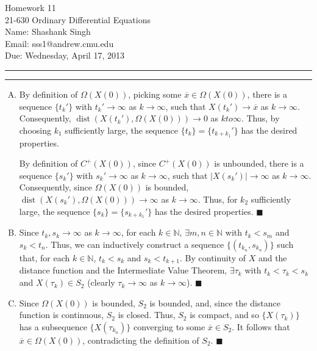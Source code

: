 \documentclass[11pt]{article}
\makeatletter
\newcounter{questionCounter}
\newcounter{partCounter}[questionCounter]
\newenvironment{question}[2][\arabic{questionCounter}]{%
    \setcounter{partCounter}{0}%
    \vspace{.25in} \hrule \vspace{0.5em}%
        \noindent{\bf #2}%
    \vspace{0.8em} \hrule \vspace{.10in}%
    \addtocounter{questionCounter}{1}%
}{}
\newcommand{\myname}{Shashank Singh}
\newcommand{\myandrew}{sss1@andrew.cmu.edu}
\newcommand{\myclass}{21-630 Ordinary Differential Equations}
\newcommand{\myhwnum}{11}
\newcommand{\duedate}{Wednesday, April 17, 2013}
\renewcommand{\qed}{\quad $\blacksquare$}
\newcommand{\dist}{\operatorname{dist}}
\newcommand{\N}{\mathbb{N}} %
\newcommand{\ol}{\overline}
\makeatother
\begin{document}
\thispagestyle{plain}

{\Large Homework \myhwnum} \\
\myclass            \\
Name: \myname       \\
Email: \myandrew    \\
Due: \duedate

\vspace{-0.2in}
\begin{question}{Problem 1}
\vspace{-0.2in}
\begin{enumerate}[A)]
\item By definition of $\Omega(X(0))$, picking some $\ol x \in \Omega(X(0))$,
there is a sequence $\{t_k'\}$ with $t_k' \to \infty$ as
$k \to \infty$, such that $X(t_k') \to \ol x$ as $k \to \infty$. Consequently,
$\dist(X(t_k'),\Omega(X(0))) \to 0$ as $k to \infty$. Thus, by choosing $k_1$
sufficiently large, the sequence $\{t_k\} = \{t_{k + k_1}'\}$ has the desired
properties.

By definition of $C^+(X(0))$, since $C^+(X(0))$ is unbounded, there is a
sequence $\{s_k'\}$ with $s_k' \to \infty$ as $k \to \infty$, such that
$|X(s_k')| \to \infty$ as $k \to \infty$. Consequently, since $\Omega(X(0))$ is
bounded, $\dist(X(s_k'),\Omega(X(0))) \to \infty$ as $k \to \infty$. Thus, for
$k_2$ sufficiently large, the sequence $\{s_k\} = \{s_{k + k_1}'\}$ has the
desired properties. \qed

\item Since $t_k,s_k \to \infty$ as $k \to \infty$, for each $k \in \N$,
$\exists m,n \in \N$ with $t_k < s_m$ and $s_k < t_n$. Thus, we can inductively
construct a sequence $\{(t_{k_n},s_{k_n})\}$ such that, for each $k \in \N$,
$t_k < s_k$ and $s_k < t_{k + 1}$. By continuity of $X$ and the distance
function and the Intermediate Value Theorem, $\exists \tau_k$ with
$t_k < \tau_k < s_k$ and $X(\tau_k) \in S_2$ (clearly $\tau_k \to \infty$ as
$k \to \infty$). \qed

\item Since $\Omega(X(0))$ is bounded, $S_2$ is bounded, and, since the
distance function is continuous, $S_2$ is closed. Thus, $S_2$ is compact, and
so $\{X(\tau_k)\}$ has a subsequence $\{X(\tau_{k_n})\}$ converging to some
$\ol x \in S_2$. It follows that $\ol x \in \Omega(X(0))$, contradicting the
definition of $S_2$. \qed
\vspace{-0.2in}
\end{enumerate}
\end{question}
\end{document}

